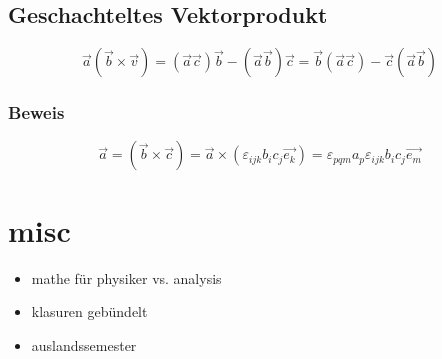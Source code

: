 \documentclass[11pt]{article}
\begin{document}
\subsection{Geschachteltes Vektorprodukt}
\label{sec-13-6}
\[\vec{a}(\vec{b}\times\vec{v})=(\vec{a}\vec{c})\vec{b}-(\vec{a}\vec{b})\vec{c}=\vec{b}(\vec{a}\vec{c})-\vec{c}(\vec{a}\vec{b})\]
\subsubsection{Beweis}
\label{sec-13-6-1}
\[\vec{a}=(\vec{b}\times\vec{c})=\vec{a}\times(\varepsilon_{ijk}b_i c_j \vec{e_k})=\varepsilon_{pqm}a_p\varepsilon_{ijk}b_i c_j \vec{e_m}\]
\section{misc}
\label{sec-14}
\begin{itemize}
\item mathe für physiker vs. analysis
\item klasuren gebündelt
\item auslandssemester
\end{itemize}
\end{document}
